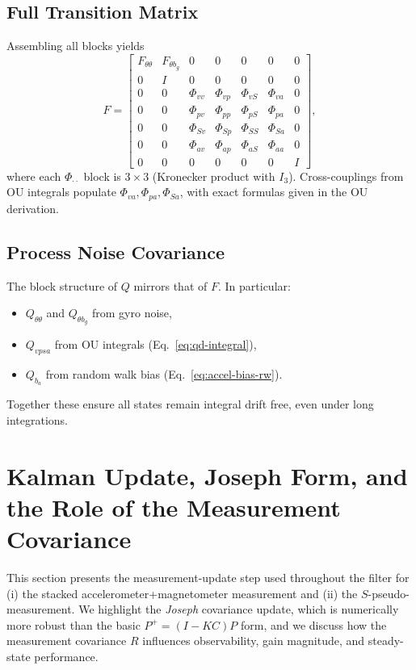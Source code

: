 \documentclass[10pt]{extarticle}
\begin{document}
\subsection{Full Transition Matrix}
Assembling all blocks yields
\begin{equation}
F =
\begin{bmatrix}
F_{\theta\theta} & F_{\theta b_g} & 0 & 0 & 0 & 0 & 0\\
0 & I & 0 & 0 & 0 & 0 & 0\\
0 & 0 & \Phi_{vv} & \Phi_{vp} & \Phi_{vS} & \Phi_{va} & 0\\
0 & 0 & \Phi_{pv} & \Phi_{pp} & \Phi_{pS} & \Phi_{pa} & 0\\
0 & 0 & \Phi_{Sv} & \Phi_{Sp} & \Phi_{SS} & \Phi_{Sa} & 0\\
0 & 0 & \Phi_{av} & \Phi_{ap} & \Phi_{aS} & \Phi_{aa} & 0\\
0 & 0 & 0 & 0 & 0 & 0 & I
\end{bmatrix},
\label{eq:F-full}
\end{equation}
where each $\Phi_{\cdot\cdot}$ block is $3\times 3$ (Kronecker product with $I_3$).
Cross-couplings from OU integrals populate $\Phi_{va},\Phi_{pa},\Phi_{Sa}$,
with exact formulas given in the OU derivation.

\subsection{Process Noise Covariance}
The block structure of $Q$ mirrors that of $F$. In particular:
\begin{itemize}
\item $Q_{\theta\theta}$ and $Q_{\theta b_g}$ from gyro noise,
\item $Q_{vpsa}$ from OU integrals (Eq.~\ref{eq:qd-integral}),
\item $Q_{b_a}$ from random walk bias (Eq.~\ref{eq:accel-bias-rw}).
\end{itemize}
Together these ensure all states remain integral drift free, even under long integrations.

\section{Kalman Update, Joseph Form, and the Role of the Measurement Covariance}
\label{sec:kalman-update}

This section presents the measurement-update step used throughout the filter for (i) the stacked
accelerometer+magnetometer measurement and (ii) the $S$-pseudo-measurement. We highlight the
\emph{Joseph} covariance update, which is numerically more robust than the basic $P^+=(I-KC)P$ form,
and we discuss how the measurement covariance $R$ influences observability, gain magnitude, and
steady-state performance.
\end{document}
